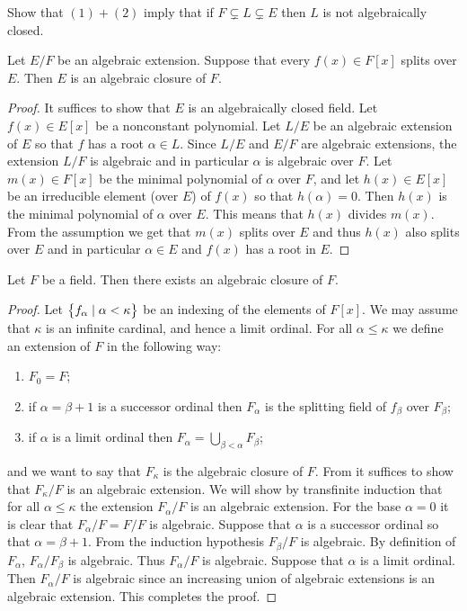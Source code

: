 \documentclass[11pt,a4paper]{article}
\begin{document}
\begin{exercise}
  Show that $(1) + (2)$ imply that if $F \subsetneq L \subsetneq E$ then $L$
  is not algebraically closed.
\end{exercise}

\begin{lemma}
  \label{lem:algebraic-closure}
  Let $E/F$ be an algebraic extension.
  Suppose that every $f(x) \in F[x]$ splits over $E$.
  Then $E$ is an algebraic closure of $F$.
\end{lemma}
\begin{proof}
  It suffices to show that $E$ is an algebraically closed field.
  Let $f(x) \in E[x]$ be a nonconstant polynomial.
  Let $L/E$ be an algebraic extension of $E$ so that $f$ has a root
  $\alpha \in L$.
  Since $L/E$ and $E/F$ are algebraic extensions,
  the extension $L/F$ is algebraic
  and in particular $\alpha$ is algebraic over $F$.
  Let $m(x) \in F[x]$ be the minimal polynomial of $\alpha$ over $F$,
  and let $h(x) \in E[x]$ be an irreducible element (over $E$) of $f(x)$
  so that $h(\alpha) = 0$.
  Then $h(x)$ is the minimal polynomial of $\alpha$ over $E$.
  This means that $h(x)$ divides $m(x)$.
  From the assumption we get that $m(x)$ splits over $E$
  and thus $h(x)$ also splits over $E$ and in particular $\alpha \in E$
  and $f(x)$ has a root in $E$.
\end{proof}

\begin{proposition}
  Let $F$ be a field.
  Then there exists an algebraic closure of $F$.
\end{proposition}
\begin{proof}
  Let $\left\{f_{\alpha} \mid \alpha < \kappa\right\}$ be an indexing of
  the elements of $F[x]$.
  We may assume that $\kappa$ is an infinite cardinal,
  and hence a limit ordinal.
  For all $\alpha \le \kappa$ we define an extension of $F$ in the following
  way:
  \begin{enumerate}
    \item[(1)] $F_0 = F$;
    \item[(2)] if $\alpha = \beta + 1$ is a successor ordinal then $F_{\alpha}$
      is the splitting field of $f_{\beta}$ over $F_{\beta}$;
    \item[(3)] if $\alpha$ is a limit ordinal then
      $F_{\alpha} = \bigcup\limits_{\beta < \alpha} F_{\beta}$;
  \end{enumerate}
  and we want to say that $F_{\kappa}$ is the algebraic closure of $F$.
  From  it suffices to show that
  $F_{\kappa}/F$ is an algebraic extension.
  We will show by transfinite induction that for all $\alpha \le \kappa$
  the extension $F_{\alpha}/F$ is an algebraic extension.
  For the base $\alpha = 0$ it is clear that $F_{\alpha}/F = F/F$ is algebraic.
  Suppose that $\alpha$ is a successor ordinal so that $\alpha = \beta + 1$.
  From the induction hypothesis $F_{\beta}/F$ is algebraic.
  By definition of $F_{\alpha}$, $F_{\alpha}/F_{\beta}$ is algebraic.
  Thus $F_{\alpha}/F$ is algebraic.
  Suppose that $\alpha$ is a limit ordinal.
  Then $F_{\alpha}/F$ is algebraic since an increasing union of
  algebraic extensions is an algebraic extension.
  This completes the proof.
\end{proof}
\end{document}
